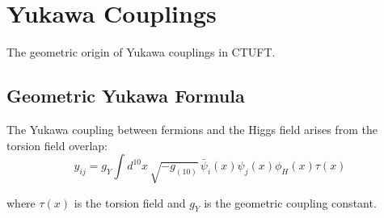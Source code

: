 \section{Yukawa Couplings}
\label{sec:yukawa}

The geometric origin of Yukawa couplings in CTUFT.

\subsection{Geometric Yukawa Formula}

The Yukawa coupling between fermions and the Higgs field arises from the torsion field overlap:
\begin{equation}
y_{ij} = g_Y \int d^{10}x \, \sqrt{-g_{(10)}} \, \bar{\psi}_i(x) \psi_j(x) \phi_H(x) \tau(x)
\end{equation}

where $\tau(x)$ is the torsion field and $g_Y$ is the geometric coupling constant.
